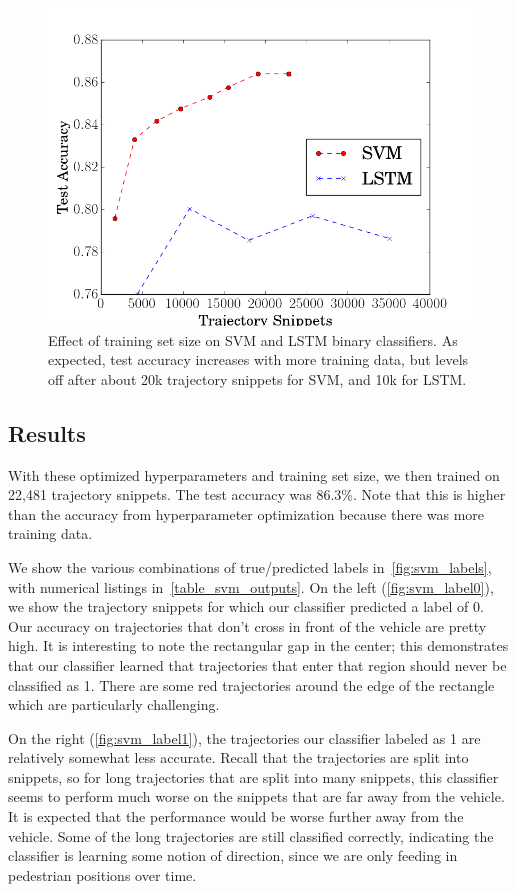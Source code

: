 \begin{figure}
  \centering
  \includegraphics [trim=0 0 0 0, clip, angle=0, width=0.8\columnwidth,
  keepaspectratio]{figures/svm_num_datapts}
  \caption{Effect of training set size on SVM and LSTM binary classifiers. As expected, test accuracy increases with more training data, but levels off after about 20k trajectory snippets for SVM, and 10k for LSTM.} 
  \label{fig:svm_num_datapts} 
\end{figure}


\subsection{Results}
With these optimized hyperparameters and training set size, we then trained on 22,481 trajectory snippets.
The test accuracy was 86.3\%.
Note that this is higher than the accuracy from hyperparameter optimization because there was more training data.

We show the various combinations of true/predicted labels in~\cref{fig:svm_labels}, with numerical listings in~\cref{table_svm_outputs}.
On the left (\cref{fig:svm_label0}), we show the trajectory snippets for which our classifier predicted a label of 0.
Our accuracy on trajectories that don't cross in front of the vehicle are pretty high.
It is interesting to note the rectangular gap in the center; this demonstrates that our classifier learned that trajectories that enter that region should never be classified as 1.
There are some red trajectories around the edge of the rectangle which are particularly challenging. 

On the right (\cref{fig:svm_label1}), the trajectories our classifier labeled as 1 are relatively somewhat less accurate.
Recall that the trajectories are split into snippets, so for long trajectories that are split into many snippets, this classifier seems to perform much worse on the snippets that are far away from the vehicle.
It is expected that the performance would be worse further away from the vehicle.
Some of the long trajectories are still classified correctly, indicating the classifier is learning some notion of direction, since we are only feeding in pedestrian positions over time.



